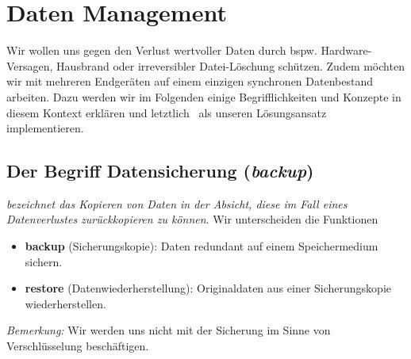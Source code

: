 \section{Daten Management}
Wir wollen uns gegen den Verlust wertvoller Daten durch bspw. Hardware-Versagen, Hausbrand oder irreversibler Datei-Löschung schützen. Zudem möchten wir mit mehreren Endgeräten auf einem einzigen synchronen Datenbestand arbeiten. Dazu werden wir im Folgenden einige Begrifflichkeiten und Konzepte in diesem Kontext erklären und letztlich \seafile~als unseren Lösungsansatz implementieren.
\subsection{Der Begriff Datensicherung (\textit{backup})}
 \textit{bezeichnet das Kopieren von Daten in der Absicht, diese im Fall eines Datenverlustes zurückkopieren zu können}. Wir unterscheiden die Funktionen
\begin{itemize}
	\item \textbf{backup} (Sicherungskopie): Daten redundant auf einem Speichermedium sichern.
	\item \textbf{restore} (Datenwiederherstellung): Originaldaten aus einer Sicherungskopie wiederherstellen.
\end{itemize}
\textit{Bemerkung:} Wir werden uns nicht mit der Sicherung im Sinne von Verschlüsselung beschäftigen.
%
%

